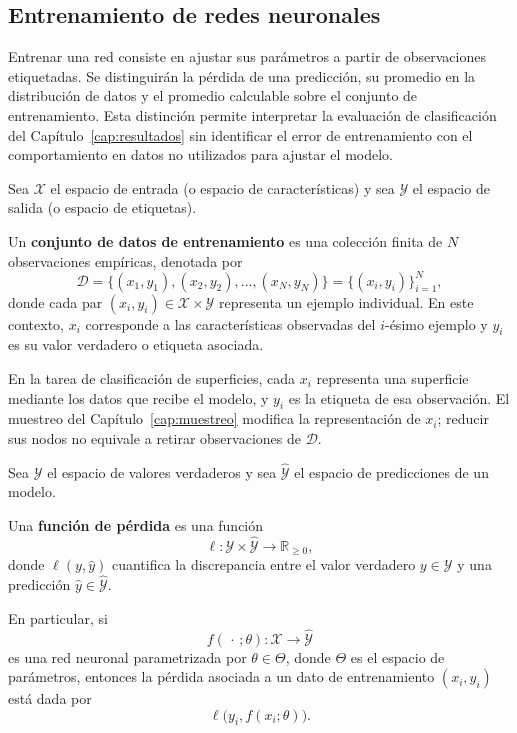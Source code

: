 \subsection{Entrenamiento de redes neuronales}

Entrenar una red consiste en ajustar sus parámetros a partir de observaciones etiquetadas. Se distinguirán la pérdida de una predicción, su promedio en la distribución de datos y el promedio calculable sobre el conjunto de entrenamiento. Esta distinción permite interpretar la evaluación de clasificación del Capítulo~\ref{cap:resultados} sin identificar el error de entrenamiento con el comportamiento en datos no utilizados para ajustar el modelo.

\begin{definition}
\label{def:conjunto-entrenamiento}
    Sea $\mathcal{X}$ el espacio de entrada (o espacio de características) y sea $\mathcal{Y}$ el espacio de salida (o espacio de etiquetas). 
    
    Un \textbf{conjunto de datos de entrenamiento} es una colección finita de $N$ observaciones empíricas, denotada por
    \[
        \mathcal{D} = \{(x_1, y_1), (x_2, y_2), \dots, (x_N, y_N)\} = \{(x_i,y_i)\}_{i=1}^N,
    \]
    donde cada par $(x_i, y_i) \in \mathcal{X} \times \mathcal{Y}$ representa un ejemplo individual. En este contexto, $x_i$ corresponde a las características observadas del $i$-ésimo ejemplo y $y_i$ es su valor verdadero o etiqueta asociada.
\end{definition}

En la tarea de clasificación de superficies, cada $x_i$ representa una superficie mediante los datos que recibe el modelo, y $y_i$ es la etiqueta de esa observación. El muestreo del Capítulo~\ref{cap:muestreo} modifica la representación de $x_i$; reducir sus nodos no equivale a retirar observaciones de $\mathcal D$.

\begin{definition}
\label{def:funcion-perdida}
Sea $\mathcal{Y}$ el espacio de valores verdaderos y sea
$\widehat{\mathcal{Y}}$ el espacio de predicciones de un modelo.

Una \textbf{función de pérdida} es una función
\[
    \ell:\mathcal{Y}\times\widehat{\mathcal{Y}}
    \longrightarrow \mathbb{R}_{\geq 0},
\]
donde $\ell(y,\hat{y})$ cuantifica la discrepancia entre el valor verdadero
$y\in\mathcal{Y}$ y una predicción
$\hat{y}\in\widehat{\mathcal{Y}}$.

En particular, si
\[
    f(\,\cdot\,;\theta):\mathcal{X}\longrightarrow
    \widehat{\mathcal{Y}}
\]
es una red neuronal parametrizada por $\theta\in\Theta$, donde $\Theta$ es el espacio de parámetros, entonces la pérdida
asociada a un dato de entrenamiento $(x_i,y_i)$ está dada por
\[
    \ell\bigl(y_i,f(x_i;\theta)\bigr).
\]

\end{definition}

